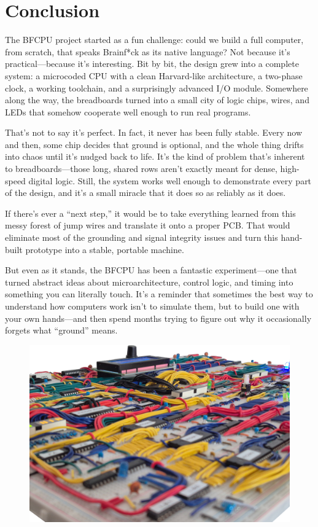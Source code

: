 \section{Conclusion} \label{sec:conclusion}
The BFCPU project started as a fun challenge: could we build a full computer, from scratch, that speaks Brainf*ck as its native language? Not because it’s practical—because it’s interesting. Bit by bit, the design grew into a complete system: a microcoded CPU with a clean Harvard-like architecture, a two-phase clock, a working toolchain, and a surprisingly advanced I/O module. Somewhere along the way, the breadboards turned into a small city of logic chips, wires, and LEDs that somehow cooperate well enough to run real programs.

That’s not to say it’s perfect. In fact, it never has been fully stable. Every now and then, some chip decides that ground is optional, and the whole thing drifts into chaos until it’s nudged back to life. It’s the kind of problem that’s inherent to breadboards—those long, shared rows aren’t exactly meant for dense, high-speed digital logic. Still, the system works well enough to demonstrate every part of the design, and it’s a small miracle that it does so as reliably as it does.

If there’s ever a “next step,” it would be to take everything learned from this messy forest of jump wires and translate it onto a proper PCB. That would eliminate most of the grounding and signal integrity issues and turn this hand-built prototype into a stable, portable machine.

But even as it stands, the BFCPU has been a fantastic experiment—one that turned abstract ideas about microarchitecture, control logic, and timing into something you can literally touch. It’s a reminder that sometimes the best way to understand how computers work isn’t to simulate them, but to build one with your own hands—and then spend months trying to figure out why it occasionally forgets what “ground” means.
\vspace{2cm}

\begin{figure}[H]
  \centering
  \includegraphics[width=\textwidth]{img/final_img}
\end{figure}


